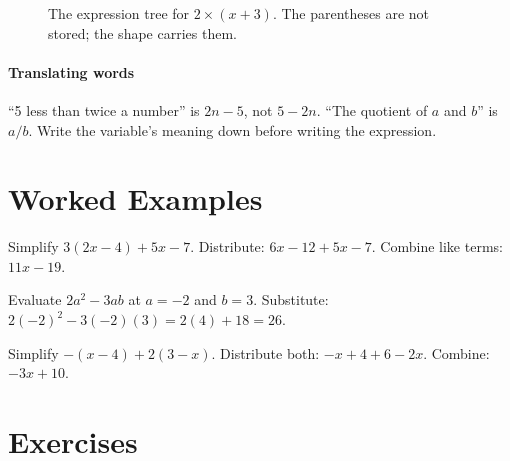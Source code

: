 \begin{figure}[H]
\centering
{}
\caption{The expression tree for $2 \times (x + 3)$. The parentheses are not stored; the shape carries them.}
\label{fig:tree}
\end{figure}

\paragraph{Translating words} ``5 less than twice a number'' is $2n - 5$, not $5 - 2n$. ``The quotient of $a$ and $b$'' is $a/b$. Write the variable's meaning down before writing the expression.

\section{Worked Examples}

\begin{example}
Simplify $3(2x - 4) + 5x - 7$.
\solution Distribute: $6x - 12 + 5x - 7$. Combine like terms: $11x - 19$.
\end{example}

\begin{example}
Evaluate $2a^2 - 3ab$ at $a = -2$ and $b = 3$.
\solution Substitute: $2(-2)^2 - 3(-2)(3) = 2(4) + 18 = 26$.
\end{example}

\begin{example}
Simplify $-(x - 4) + 2(3 - x)$.
\solution Distribute both: $-x + 4 + 6 - 2x$. Combine: $-3x + 10$.
\end{example}

\section{Exercises}

